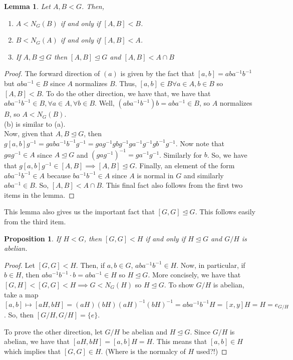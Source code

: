 \documentclass[11pt,leqno,oneside]{amsart}
\newcommand{\subgroup}{\mathrel{<}}
\newcommand{\normsubgroup}{\mathrel{\unlhd}}
\newtheorem{lem}[thm]{Lemma}
\newtheorem{prop}[thm]{Proposition}
\theoremstyle{definition}
\numberwithin{equation}{section}
\begin{document}
\begin{lem}
    Let $A,B \subgroup G$. Then,
    \begin{enumerate}[label=(\alph*)]
        \item $A \subgroup N_G(B)$ if and only if $[A,B] \subgroup B$.
        \item $B \subgroup N_G(A)$ if and only if $[A,B] \subgroup A$.
        \item If $A,B \normsubgroup G$ then $[A,B] \normsubgroup G$ and $[A,B]
            \subgroup A \cap B$
    \end{enumerate}
\end{lem}
\begin{proof}
    The forward direction of $(a)$ is given by the fact that $[a,b] =
    aba^{-1}b^{-1}$ but $aba^{-1} \in B$ since $A$ normalizes $B$. Thus, $[a,b]
    \in B \forall a \in A, b \in B$ so $[A,B] \subgroup B$. To do the other
    direction, we have that, we have that $aba^{-1}b^{-1} \in B, \forall a \in A,
    \forall b \in B$. Well, $(aba^{-1}b^{-1})b = aba^{-1} \in B$, so $A$
    normalizes $B$, so $A \subgroup N_G(B)$. \\

    (b) is similar to (a). \\

    Now, given that $A,B \normsubgroup G$, then $g[a,b]g^{-1} =
    gaba^{-1}b^{-1}g^{-1} = gag^{-1}gbg^{-1}ga^{-1}g^{-1}gb^{-1}g^{-1}$. Now
    note that $gag^{-1} \in A$ since $A \normsubgroup G$ and $(gag^{-1})^{-1} =
    ga^{-1}g^{-1}$. Similarly for $b$. So, we have that $g[a,b]g^{-1} \in [A,B]
    \implies [A,B] \normsubgroup G$. Finally, an element of the form
    $aba^{-1}b^{-1} \in A$ because $ba^{-1}b^{-1} \in A$ since $A$ is normal in
    $G$ and similarly $aba^{-1} \in B$. So, $[A,B] \subgroup A \cap B$. This
    final fact also follows from the first two items in the lemma.
\end{proof}

This lemma also gives us the important fact that $[G,G] \normsubgroup G$. This
follows easily from the third item.

\begin{prop}
    If $H \subgroup G$, then $[G,G] \subgroup H$ if and only if $H
    \normsubgroup G$ and $G/H$ is abelian.
\end{prop}
\begin{proof}
    Let $[G,G] \subgroup H$. Then, if $a,b \in G$, $aba^{-1}b^{-1} \in H$. Now,
    in particular, if $b \in H$, then $aba^{-1}b^{-1} \cdot b = aba^{-1} \in H$
    so $H \normsubgroup G$. More concisely, we have that $[G,H] \subgroup [G,G]
    \subgroup H \implies G \subgroup N_G(H)$ so $H \normsubgroup G$. To show
    $G/H$ is abelian, take a map $[a,b] \mapsto [aH,bH] =
    (aH)(bH)(aH)^{-1}(bH)^{-1} = aba^{-1}b^{-1}H = [x,y]H = H = e_{G/H}$. So,
    then $[G/H,G/H] = \{e\}$.

    To prove the other direction, let $G/H$ be abelian and $H \normsubgroup G$.
    Since $G/H$ is abelian, we have that $[aH,bH] = [a,b]H = H$. This means
    that $[a,b] \in H$ which implies that $[G,G] \in H$. (Where is the normalcy
    of $H$ used?!)
\end{proof}
\end{document}
